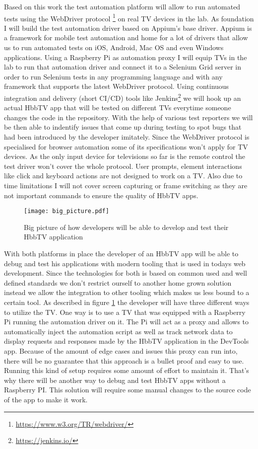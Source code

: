 Based on this work the test automation platform will allow to run automated tests using the WebDriver
protocol \footnote{\url{https://www.w3.org/TR/webdriver/}} on real TV devices in the lab. As foundation I will build the
test automation driver based on Appium's base driver. Appium is a framework for mobile test automation and home
for a lot of drivers that allow us to run automated tests on iOS, Android, Mac OS and even Windows applications.
Using a Raspberry Pi as automation proxy I will equip TVs in the lab to run that automation driver and connect
it to a Selenium Grid server in order to run Selenium tests in any programming language and with any framework
that supports the latest WebDriver protocol. Using continuous integration and delivery (short CI/CD) tools like
Jenkins\footnote{\url{https://jenkins.io/}} we will hook up an actual HbbTV app that will be tested on different
TVs everytime someone changes the code in the repository. With the help of various test reporters we will be then
able to indentify issues that come up during testing to spot bugs that had been introduced by the developer
imitately. Since the WebDriver protocol is specialised for browser automation some of its specifications won't
apply for TV devices. As the only input device for televisions so far is the remote control the test driver won't
cover the whole protocol. User prompts, element interactions like click and keyboard actions are not designed
to work on a TV. Also due to time limitations I will not cover screen capturing or frame switching as they are
not important commands to ensure the quality of HbbTV apps.

\begin{figure}[htb]
  \centering
  \texttt{[image: big\_picture.pdf]}
  \caption{Big picture of how developers will be able to develop and test their HbbTV application}\label{fig:bigpicture}
\end{figure}

With both platforms in place the developer of an HbbTV app will be able to debug and test his applications
with modern tooling that is used in todays web development. Since the technologies for both is based on
common used and well defined standards we don't restrict ourself to another home grown solution instead we
allow the integration to other tooling which makes us less bound to a certain tool. As described in figure
\ref{fig:bigpicture} the developer will have three different ways to utilize the TV. One way is to use
a TV that was equipped with a Raspberry Pi running the automation driver on it. The Pi will act as a proxy
and allows to automatically inject the automation script as well as track network data to display requests
and responses made by the HbbTV application in the DevTools app. Because of the amount of edge cases and
issues this proxy can run into, there will be no guarantee that this approach is a bullet proof and easy to
use. Running this kind of setup requires some amount of effort to maintain it. That's why there
will be another way to debug and test HbbTV apps without a Raspberry PI. This solution will require some
manual changes to the source code of the app to make it work.

